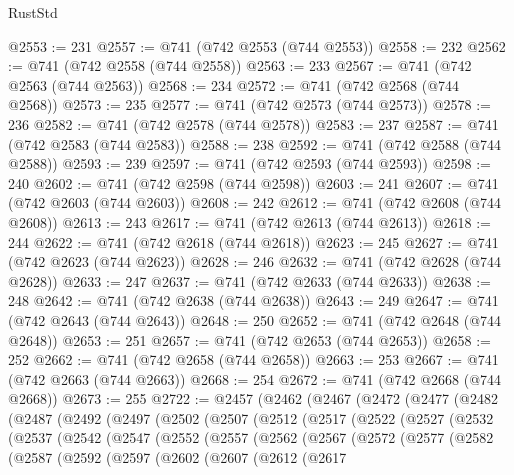 \begin{lexlean}{RustStd}
\begin{coremodule}
{\begin{coremodule}
{{{{{{{{{{{{{{{{{{{{{{{{{{{{{{{{{{{{{{{{{{{{{@2553 := 231
@2557 := @741 (@742 @2553 (@744 @2553))
@2558 := 232
@2562 := @741 (@742 @2558 (@744 @2558))
@2563 := 233
@2567 := @741 (@742 @2563 (@744 @2563))
@2568 := 234
@2572 := @741 (@742 @2568 (@744 @2568))
@2573 := 235
@2577 := @741 (@742 @2573 (@744 @2573))
@2578 := 236
@2582 := @741 (@742 @2578 (@744 @2578))
@2583 := 237
@2587 := @741 (@742 @2583 (@744 @2583))
@2588 := 238
@2592 := @741 (@742 @2588 (@744 @2588))
@2593 := 239
@2597 := @741 (@742 @2593 (@744 @2593))
@2598 := 240
@2602 := @741 (@742 @2598 (@744 @2598))
@2603 := 241
@2607 := @741 (@742 @2603 (@744 @2603))
@2608 := 242
@2612 := @741 (@742 @2608 (@744 @2608))
@2613 := 243
@2617 := @741 (@742 @2613 (@744 @2613))
@2618 := 244
@2622 := @741 (@742 @2618 (@744 @2618))
@2623 := 245
@2627 := @741 (@742 @2623 (@744 @2623))
@2628 := 246
@2632 := @741 (@742 @2628 (@744 @2628))
@2633 := 247
@2637 := @741 (@742 @2633 (@744 @2633))
@2638 := 248
@2642 := @741 (@742 @2638 (@744 @2638))
@2643 := 249
@2647 := @741 (@742 @2643 (@744 @2643))
@2648 := 250
@2652 := @741 (@742 @2648 (@744 @2648))
@2653 := 251
@2657 := @741 (@742 @2653 (@744 @2653))
@2658 := 252
@2662 := @741 (@742 @2658 (@744 @2658))
@2663 := 253
@2667 := @741 (@742 @2663 (@744 @2663))
@2668 := 254
@2672 := @741 (@742 @2668 (@744 @2668))
@2673 := 255
@2722 := @2457
    (@2462
      (@2467
        (@2472
          (@2477
            (@2482
              (@2487
                (@2492
                  (@2497
                    (@2502
                      (@2507
                        (@2512
                          (@2517
                            (@2522
                              (@2527
                                (@2532
                                  (@2537
                                    (@2542
                                      (@2547
                                        (@2552
                                          (@2557
                                            (@2562
                                              (@2567
                                                (@2572
                                                  (@2577
                                                    (@2582
                                                      (@2587
                                                        (@2592
                                                          (@2597
                                                            (@2602
                                                              (@2607
                                                                (@2612
                                                                  (@2617
}}}}}}}}}}}}}}}}}}}}}}}}}}}}}}}}}}}}}}}}}}}}}
\end{coremodule}}
\end{coremodule}
\end{lexlean}
